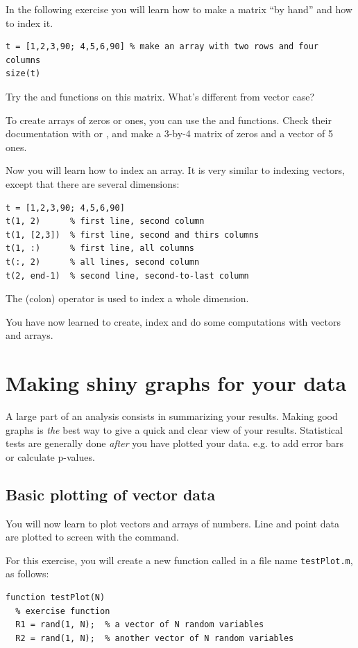 \documentclass{article}
\begin{document}
In the following exercise you will learn how to make a matrix ``by hand'' and how to index it.
\begin{lstlisting}
t = [1,2,3,90; 4,5,6,90] % make an array with two rows and four columns
size(t)
\end{lstlisting}
Try the  and  functions on this matrix.
What's different from vector case?

To create arrays of zeros or ones, you can use the  and  functions.
Check their documentation with  or , and make a 3-by-4 matrix of zeros and a vector of 5 ones.

Now you will learn how to index an array.
It is very similar to indexing vectors, except that there are several dimensions:
\begin{lstlisting}
t = [1,2,3,90; 4,5,6,90]
t(1, 2)      % first line, second column
t(1, [2,3])  % first line, second and thirs columns
t(1, :)      % first line, all columns
t(:, 2)      % all lines, second column
t(2, end-1)  % second line, second-to-last column
\end{lstlisting}
The \mcode{:} (colon) operator is used to index a whole dimension.

You have now learned to create, index and do some computations with vectors and arrays.


\pagebreak
\section{Making shiny graphs for your data}

A large part of an analysis consists in summarizing your results.
Making good graphs is \textit{the} best way to give a quick and clear view of your results.
Statistical tests are generally done \textit{after} you have plotted your data. e.g. to add error bars or calculate p-values.


\subsection{Basic plotting of vector data}

You will now learn to plot vectors and arrays of numbers.
Line and point data are plotted to screen with the  command.

For this exercise, you will create a new function called  in a file name \verb|testPlot.m|, as follows:
\begin{lstlisting}
function testPlot(N)
  % exercise function
  R1 = rand(1, N);  % a vector of N random variables
  R2 = rand(1, N);  % another vector of N random variables
\end{lstlisting}
\end{document}
